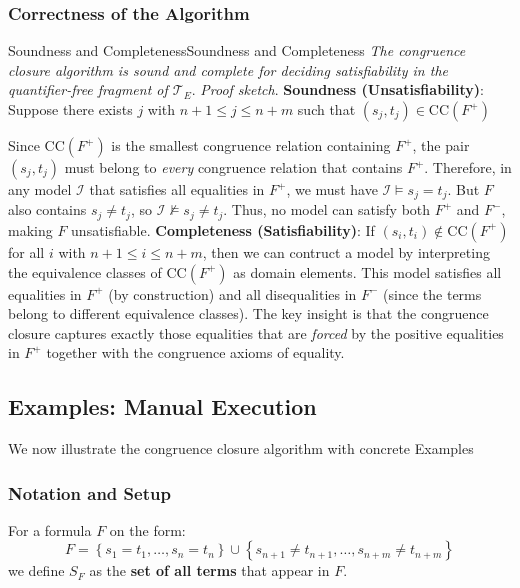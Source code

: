 \documentclass[a4paper]{article}
\theoremstyle{definition}
\begin{document}
\subsubsection{Correctness of the Algorithm}
\begin{theorem}{Soundness and Completeness}{Soundness and Completeness}
\textit{The congruence closure algorithm is sound and complete for deciding satisfiability in the quantifier-free fragment 
of \( \mathcal{T}_{E} \)}.
\vspace{1em}
\noindent
\newline
\textit{Proof sketch}. \textbf{Soundness (Unsatisfiability)}: Suppose there exists \( j \) with \( n + 1 \leq j \leq n + m \) such that \( (s_j, t_j) \in \mathrm{CC}(F^+) \)
\end{theorem}
Since \( \mathrm{CC}(F^+) \) is the smallest congruence relation containing \( F^+ \), the pair \( (s_j, t_j) \) must belong 
to \textit{every} congruence relation that contains \( F^+ \).
\vspace{1em}
\noindent
\newline
Therefore, in any model \( \mathcal{I} \) that satisfies all equalities in \( F^+ \), we must have \( \mathcal{I} \models s_j = t_j \). But
\( F \) also contains \( s_j \neq t_j \), so \( \mathcal{I} \nvDash s_j \neq t_j \). Thus, no model can satisfy both \( F^+ \) and \( F^- \), making 
\( F \) unsatisfiable.
\vspace{1em}
\noindent
\newline
\textbf{Completeness (Satisfiability)}: If \( (s_i, t_i) \notin \mathrm{CC}(F^+) \) for all \( i \) with \( n + 1 \leq i \leq n + m \), then 
we can contruct a model by interpreting the equivalence classes of \( \mathrm{CC}(F^+) \) as domain elements.
This model satisfies all equalities in \( F^+ \) (by construction) and all disequalities in \( F^- \) (since the terms belong to 
different equivalence classes).
\vspace{1em}
\noindent
\newline
The key insight is that the congruence closure captures exactly those equalities that are \textit{forced} by the positive 
equalities in \( F^+ \) together with the congruence axioms of equality.
\subsection{Examples: Manual Execution}
We now illustrate the congruence closure algorithm with concrete Examples
\subsubsection{Notation and Setup}
For a formula \( F \) on the form:
\[
  F = \left\{s_1 = t_1, \ldots, s_n = t_n \right\} \cup \left\{s_{n + 1} \neq t_{n + 1}, \ldots, s_{n + m} \neq t_{n + m} \right\}
\]
we define \( S_F \) as the \textbf{set of all terms} that appear in \( F \).
\end{document}
